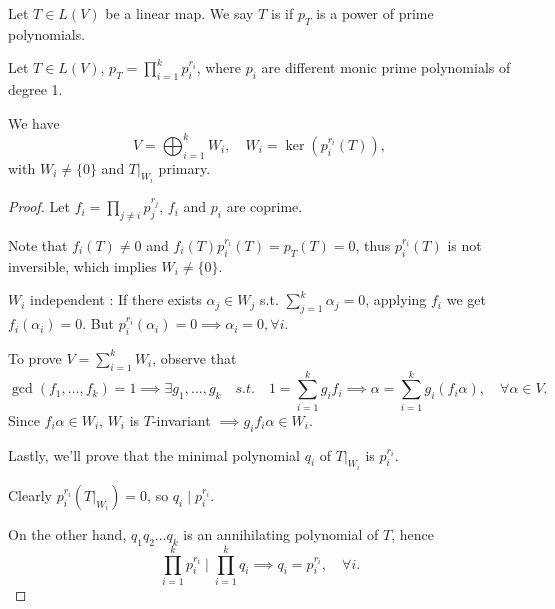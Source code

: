 \begin{definition}
	Let $T\in L(V)$ be a linear map. We say $T$ is 
	if $p_T$ is a power of prime polynomials.
\end{definition}

\begin{theorem}
    Let $T\in L(V)$,  $p_T = \prod_{i=1}^k p_i^{r_i}$,
	where $p_i$ are different monic prime polynomials of degree 1.

	We have
	\[
	V = \bigoplus_{i=1}^k W_i, \quad W_i = \ker\left(p_i^{r_i}(T)\right),
	\]
	with $W_i \ne \{0\}$ and $T\big|_{W_i}$ primary.
\end{theorem}
\begin{proof}[Proof]
    Let $f_i = \prod_{j\ne i}p_j^{r_j}$, $f_i$ and $p_i$ are coprime.

	Note that $f_i(T)\ne 0$ and $f_i(T)p_i^{r_i}(T) = p_T(T) = 0$,
	thus $p_i^{r_i}(T)$ is not inversible, which implies $W_i \ne \{0\}$.

	$W_i$ independent :
	If there exists $\alpha_j\in W_j$ s.t. $\sum_{j=1}^k \alpha_j = 0$,
	applying $f_i$ we get $f_i(\alpha_i) = 0$.
	But $p_i^{r_i}(\alpha_i) = 0 \implies \alpha_i = 0, \forall i$.

	To prove $V=\sum_{i=1}^k W_i$, observe that
	\[
	\gcd(f_1,\dots,f_k) = 1\implies \exists g_1,\dots,g_k
	\quad s.t.\quad 1 = \sum_{i=1}^k g_if_i
	\implies \alpha = \sum_{i=1}^k g_i(f_i\alpha),\quad \forall \alpha\in V.
	\]
	Since $f_i\alpha \in W_i$, $W_i$ is $T$-invariant $\implies g_if_i\alpha\in W_i$.

	Lastly, we'll prove that the minimal polynomial $q_i$ of $T\big|_{W_i}$ is $p_i^{r_i}$.

	Clearly $p_i^{r_i}(T\big|_{W_i}) = 0$, so $q_i\mid p_i^{r_i}$.

	On the other hand, $q_1q_2\dots q_k$ is an annihilating polynomial of $T$,
	hence
	\[
		\prod_{i=1}^k p_i^{r_i}\mid \prod_{i=1}^k q_i\implies q_i = p_i^{r_i}, \quad \forall i.
	\]
\end{proof}
